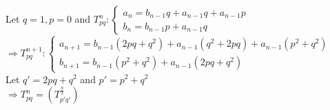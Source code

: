 \documentclass{article}
\begin{document}
\noindent Let $q = 1, p = 0$ and
$
T_{pq}^n:
\begin{cases}
  a_n = b_{n-1}q + a_{n-1}q + a_{n-1}p\\
  b_n = b_{n-1}p + a_{n-1}q
\end{cases}$\\
  
$\Rightarrow
T_{pq}^{n+1} :
\begin{cases}
  a_{n+1} = b_{n-1} (2pq + q^2) + a_{n-1} (q^2 + 2pq)
  + a_{n-1} (p^2 + q^2)\\
  b_{n+1} = b_{n-1}(p^2+q^2) + a_{n-1} (2pq + q^2)
  \end{cases}
  $\\
  Let $q' = 2pq + q^2 $ and $p' = p^2 + q^2$\\
  $\Rightarrow T_{pq}^n = (T_{p'q'}^{\frac{n}{2}})$
 
\end{document}
